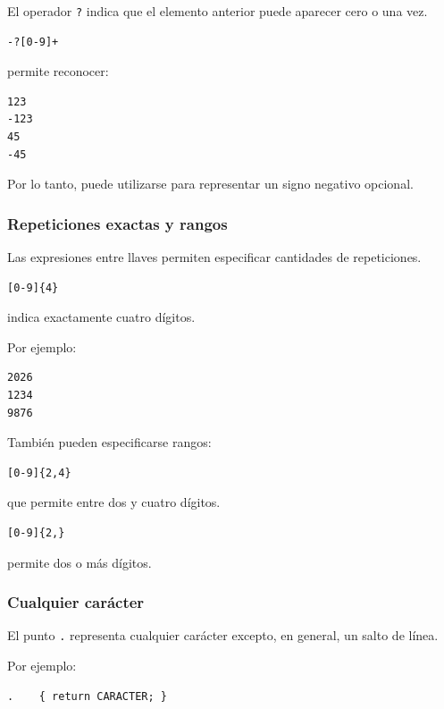 \documentclass{article}
\begin{document}
El operador \texttt{?} indica que el elemento anterior puede aparecer
cero o una vez.

\begin{verbatim}
-?[0-9]+
\end{verbatim}

permite reconocer:

\begin{verbatim}
123
-123
45
-45
\end{verbatim}

Por lo tanto, puede utilizarse para representar un signo negativo
opcional.

\subsubsection{Repeticiones exactas y rangos}

Las expresiones entre llaves permiten especificar cantidades de
repeticiones.

\begin{verbatim}
[0-9]{4}
\end{verbatim}

indica exactamente cuatro dígitos.

Por ejemplo:

\begin{verbatim}
2026
1234
9876
\end{verbatim}

También pueden especificarse rangos:

\begin{verbatim}
[0-9]{2,4}
\end{verbatim}

que permite entre dos y cuatro dígitos.

\begin{verbatim}
[0-9]{2,}
\end{verbatim}

permite dos o más dígitos.

\subsubsection{Cualquier carácter}

El punto \texttt{.} representa cualquier carácter excepto, en general,
un salto de línea.

Por ejemplo:

\begin{verbatim}
.    { return CARACTER; }
\end{verbatim}
\end{document}
